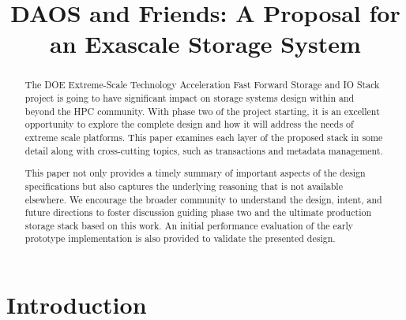 \documentclass[conference]{IEEEtran} \pdfpagewidth=8.5in
\begin{document}
\title{DAOS and Friends: A Proposal for\\an Exascale Storage System}

\author{
}
\maketitle

\begin{abstract}
The DOE Extreme-Scale Technology Acceleration Fast Forward Storage and IO Stack
project is going to have significant impact on storage systems design within
and beyond the HPC community. With phase two of the project starting, it is an
excellent opportunity to explore the complete design and how it will address
the needs of extreme scale platforms.  This paper examines each layer of the
proposed stack in some detail along with cross-cutting topics, such as
transactions and metadata management.

This paper not only provides a timely summary of important aspects of the
design specifications but also captures the underlying reasoning that is not
available elsewhere. We encourage the broader community to understand the
design, intent, and future directions to foster discussion guiding phase two
and the ultimate production storage stack based on this work.  An initial
performance evaluation of the early prototype implementation is also provided
to validate the presented design.

\end{abstract}



\section{Introduction}
\end{document}

